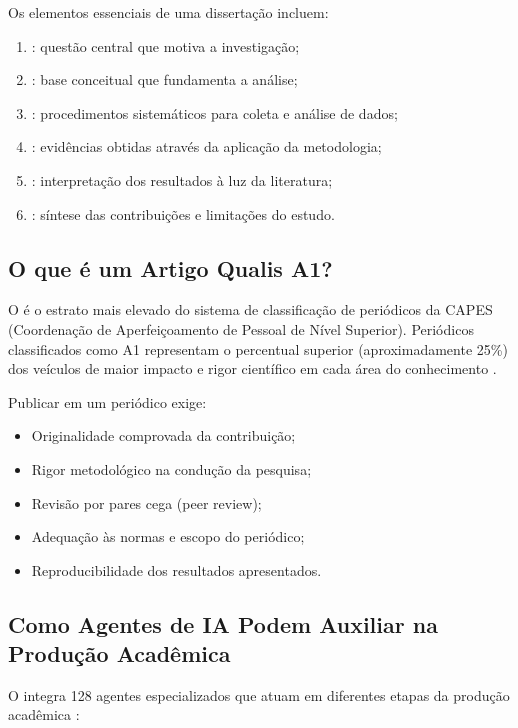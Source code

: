 Os elementos essenciais de uma dissertação incluem:
\begin{enumerate}
\item {}: questão central que motiva a investigação;
\item {}: base conceitual que fundamenta a análise;
\item {}: procedimentos sistemáticos para coleta e análise de dados;
\item {}: evidências obtidas através da aplicação da metodologia;
\item {}: interpretação dos resultados à luz da literatura;
\item {}: síntese das contribuições e limitações do estudo.
\end{enumerate}

\subsection{O que é um Artigo Qualis A1?}

O \qualisA{} é o estrato mais elevado do sistema de classificação de periódicos
da CAPES (Coordenação de Aperfeiçoamento de Pessoal de Nível Superior). Periódicos
classificados como A1 representam o percentual superior (aproximadamente 25\%) dos
veículos de maior impacto e rigor científico em cada área do conhecimento
\cite{laranjeira2026opencode}.

Publicar em um periódico \qualisA{} exige:
\begin{itemize}
\item Originalidade comprovada da contribuição;
\item Rigor metodológico na condução da pesquisa;
\item Revisão por pares cega (peer review);
\item Adequação às normas e escopo do periódico;
\item Reproducibilidade dos resultados apresentados.
\end{itemize}

\subsection{Como Agentes de IA Podem Auxiliar na Produção Acadêmica}

O \opencodeeco{} integra 128 agentes especializados que atuam em diferentes
etapas da produção acadêmica \cite{opencode2026ecosystem}:

